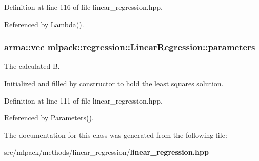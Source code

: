Definition at line 116 of file linear\-\_\-regression.\-hpp.



Referenced by Lambda().

\subsubsection[{parameters}]{\setlength{\rightskip}{0pt plus 5cm}arma\-::vec mlpack\-::regression\-::\-Linear\-Regression\-::parameters\hspace{0.3cm}{\ttfamily [private]}}\label{classmlpack_1_1regression_1_1LinearRegression_a78cf4010260f1fb39df06c0e6f6c9184}


The calculated B. 

Initialized and filled by constructor to hold the least squares solution. 

Definition at line 111 of file linear\-\_\-regression.\-hpp.



Referenced by Parameters().



The documentation for this class was generated from the following file\-:\begin{DoxyCompactItemize}
\item 
src/mlpack/methods/linear\-\_\-regression/{\bf linear\-\_\-regression.\-hpp}\end{DoxyCompactItemize}
